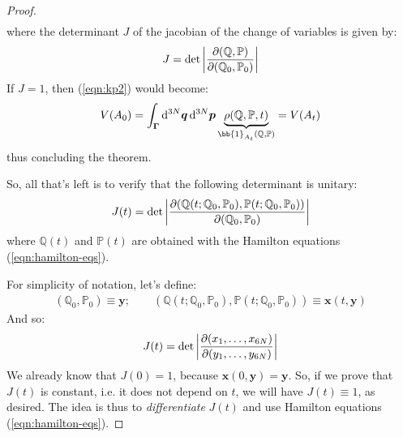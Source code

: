 \documentclass[../template.tex]{subfiles}
\begin{document}
\begin{proof}
\begin{align*}
    \end{align*}
    where the determinant $J$ of the jacobian of the change of variables is given by:
    \begin{align*}
        J = \operatorname{det}\left| \pdv{(\mathbb{Q}, \mathbb{P})}{(\mathbb{Q}_0, \mathbb{P}_0)}\right|
    \end{align*}
    If $J = 1$, then (\ref{eqn:kp2}) would become:
    \begin{align*}
        V(A_0) = \int_{\bm{\Gamma}} \dd[3N]{\bm{q}} \dd[3N]{\bm{p}} \underbrace{\rho(\mathbb{Q}, \mathbb{P}, t)}_{\bb{1}_{A_t}(\mathbb{Q}, \mathbb{P})} = V(A_t)
    \end{align*} 
    thus concluding the theorem.

    \medskip

    So, all that's left is to verify that the following determinant is unitary:
    \begin{align*}
        J(t) = \operatorname{det}\left| \pdv{(\mathbb{Q}(t; \mathbb{Q}_0, \mathbb{P}_0), \mathbb{P}(t; \mathbb{Q}_0, \mathbb{P}_0))}{(\mathbb{Q}_0, \mathbb{P}_0)}\right|
    \end{align*}
    where $\mathbb{Q}(t)$ and $\mathbb{P}(t)$ are obtained with the Hamilton equations (\ref{eqn:hamilton-eqs}). 

    \medskip

    For simplicity of notation, let's define:
    \begin{align}\label{eqn:simplicity-not}
        (\mathbb{Q}_0, \mathbb{P}_0) \equiv \bm{y}; \qquad (\mathbb{Q}(t; \mathbb{Q}_0, \mathbb{P}_0), \mathbb{P}(t; \mathbb{Q}_0, \mathbb{P}_0)) \equiv \bm{x}(t, \bm{y})
    \end{align}
    And so:
    \begin{align*}
        J(t) = \operatorname{det}\left| \pdv{(x_1,\dots, x_{6N})}{(y_1, \dots, y_{6N})}\right|
    \end{align*}
    We already know that $J(0) = 1$, because $\bm{x}(0,\bm{y}) = \bm{y}$. So, if we prove that $J(t)$ is constant, i.e. it does not depend on $t$, we will have $J(t) \equiv 1$, as desired. The idea is thus to \textit{differentiate} $J(t)$ and use Hamilton equations (\ref{eqn:hamilton-eqs}).
    
    \medskip


\end{proof}
\end{document}
